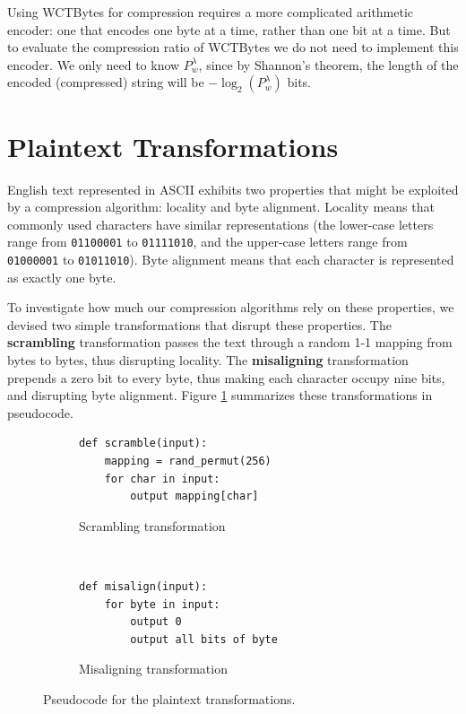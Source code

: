 \documentclass[11pt]{scrartcl}
\begin{document}
Using WCTBytes for compression requires a more complicated arithmetic encoder:
one that encodes one byte at a time, rather than one bit at a time. But to
evaluate the compression ratio of WCTBytes we do not need to implement this
encoder. We only need to know $P_w^\lambda$, since by Shannon's theorem, the
length of the encoded (compressed) string will be $-\log_2(P_w^\lambda)$ bits.


\section{Plaintext Transformations}

English text represented in ASCII exhibits two properties that might be
exploited by a compression algorithm: locality and byte alignment. Locality
means that commonly used characters have similar representations (the
lower-case letters range from {\tt 01100001} to {\tt 01111010}, and the
upper-case letters range from {\tt 01000001} to {\tt 01011010}). Byte alignment
means that each character is represented as exactly one byte.

To investigate how much our compression algorithms rely on these properties, we
devised two simple transformations that disrupt these properties. The {\bf
scrambling} transformation passes the text through a random 1-1 mapping from
bytes to bytes, thus disrupting locality. The {\bf misaligning} transformation
prepends a zero bit to every byte, thus making each character occupy nine bits,
and disrupting byte alignment. Figure \ref{fig:transformations} summarizes
these transformations in pseudocode.

\begin{figure}[h!]
    \centering
    \begin{subfigure}[b]{0.45\textwidth}
\begin{verbatim}
def scramble(input):
    mapping = rand_permut(256)
    for char in input:
        output mapping[char] \end{verbatim}
        \caption{Scrambling transformation}
    \end{subfigure}
    ~
    \begin{subfigure}[b]{0.45\textwidth}
\begin{verbatim}
def misalign(input):
    for byte in input:
        output 0
        output all bits of byte \end{verbatim}
        \caption{Misaligning transformation}
    \end{subfigure}
    \caption{Pseudocode for the plaintext transformations.}
    \label{fig:transformations}
\end{figure}
\end{document}

